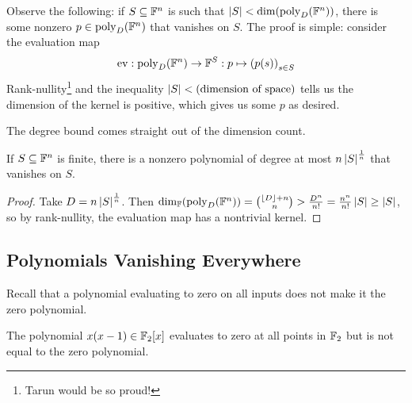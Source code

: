 Observe the following: if $S \subseteq \mathbb{F}^n$ is such that $\left\lvert S \right\rvert < \dim\!\left( \operatorname{poly}_D\!\left( \mathbb{F}^n \right) \right)$, there is some nonzero $p \in \operatorname{poly}_D\!\left( \mathbb{F}^n \right)$ that vanishes on $S$. The proof is simple: consider the evaluation map
\begin{align*}
    \operatorname{ev} : \operatorname{poly}_D\!\left( \mathbb{F}^n \right) \to \mathbb{F}^{S} : p \mapsto \left( p(s) \right)_{s \in S}
\end{align*}
Rank-nullity\footnote{Tarun would be so proud!} and the inequality $\left\lvert S \right\rvert < \left( \text{dimension of space} \right)$ tells us the dimension of the kernel is positive, which gives us some $p$ as desired.

The degree bound comes straight out of the dimension count.

\begin{boxlemma} \label{Ch7:Lemma:Low_Degree_Vanishing}
    If $S \subseteq \mathbb{F}^n$ is finite, there is a nonzero polynomial of degree at most $n \left\lvert S \right\rvert^{\frac{1}{n}}$ that vanishes on $S$.
\end{boxlemma}
\begin{proof}
    Take $D = n \left\lvert S \right\rvert^{\frac{1}{n}}$. Then $\dim_{\mathbb{F}}\!\left( \operatorname{poly}_D\!\left( \mathbb{F}^n \right) \right) = \binom{\left\lfloor D \right\rfloor + n}{n} > \frac{D^n}{n!} = \frac{n^n}{n!}\left\lvert S \right\rvert \geq \left\lvert S \right\rvert$, so by rank-nullity, the evaluation map has a nontrivial kernel.
\end{proof}

\subsection{Polynomials Vanishing Everywhere}

Recall that a polynomial evaluating to zero on all inputs does not make it the zero polynomial.

\begin{boxcexample}
    The polynomial $x(x - 1) \in \mathbb{F}_2[x]$ evaluates to zero at all points in $\mathbb{F}_2$ but is not equal to the zero polynomial.
\end{boxcexample}

